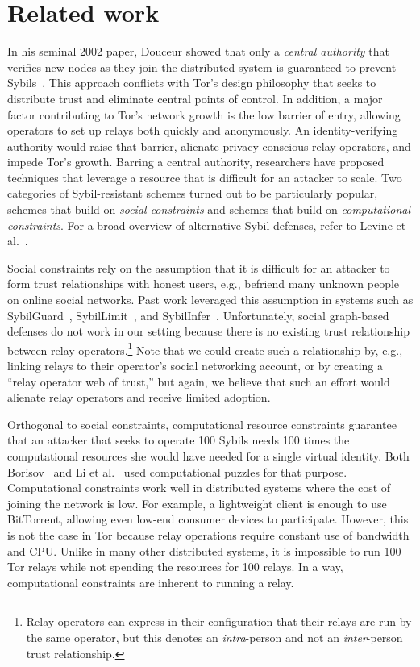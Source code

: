 \section{Related work}
\label{sec:related_work}
In his seminal 2002 paper, Douceur showed that only a \emph{central authority}
that verifies new nodes as they join the distributed system is guaranteed to
prevent Sybils~\cite{Douceur2002a}.  This approach conflicts with Tor's design
philosophy that seeks to distribute trust and eliminate central points of
control.  In addition, a major factor contributing to Tor's network growth is
the low barrier of entry, allowing operators to set up relays both quickly and
anonymously.  An identity-verifying authority would raise that barrier, alienate
privacy-conscious relay operators, and impede Tor's growth.  Barring a central
authority, researchers have proposed techniques that leverage a resource that is
difficult for an attacker to scale.  Two categories of Sybil-resistant schemes
turned out to be particularly popular, schemes that build on \emph{social
constraints} and schemes that build on \emph{computational constraints}.  For a
broad overview of alternative Sybil defenses, refer to Levine et
al.~\cite{Levine2006a}.

Social constraints rely on the assumption that it is difficult for an attacker
to form trust relationships with honest users, e.g., befriend many unknown
people on online social networks.  Past work leveraged this assumption in
systems such as SybilGuard~\cite{Yu2006a}, SybilLimit~\cite{Yu2008a}, and
SybilInfer~\cite{Danezis2009a}.  Unfortunately, social graph-based defenses
do not work in our setting because there is no existing trust relationship
between relay operators.\footnote{Relay operators can express in their
configuration that their relays are run by the same operator, but this
denotes an \emph{intra}-person and not an \emph{inter}-person trust
relationship.} Note that we could create such a relationship by, e.g., linking
relays to their operator's social networking account, or by creating a ``relay
operator web of trust,'' but again, we believe that such an effort would
alienate relay operators and receive limited adoption.

Orthogonal to social constraints, computational resource constraints guarantee
that an attacker that seeks to operate 100 Sybils needs 100 times the
computational resources she would have needed for a single virtual identity.
Both Borisov~\cite{Borisov2006a} and Li et al.~\cite{Li2012a} used computational
puzzles for that purpose.  Computational constraints work well in distributed
systems where the cost of joining the network is low.  For example, a
lightweight client is enough to use BitTorrent, allowing even low-end consumer
devices to participate.  However, this is not the case in Tor because relay
operations require constant use of bandwidth and CPU.  Unlike in many other
distributed systems, it is impossible to run 100 Tor relays while not spending
the resources for 100 relays.  In a way, computational constraints are inherent
to running a relay.

